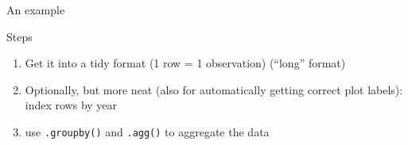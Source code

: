 \documentclass{beamer}
\begin{document}
\begin{frame}[plain]
An example
\end{frame}


{
	\begin{frame}[plain]
\end{frame}
}

\begin{frame}{Steps}
\begin{enumerate}
	\item Get it into a tidy format (1 row = 1 observation) (``long'' format)
	\item Optionally, but more neat (also for automatically getting correct plot labels): \\ index rows by year
	\item use \texttt{.groupby()} and \texttt{.agg()} to aggregate the data
\end{enumerate}
\end{frame}


{
	\begin{frame}[plain]
\end{frame}
}
\end{document}

